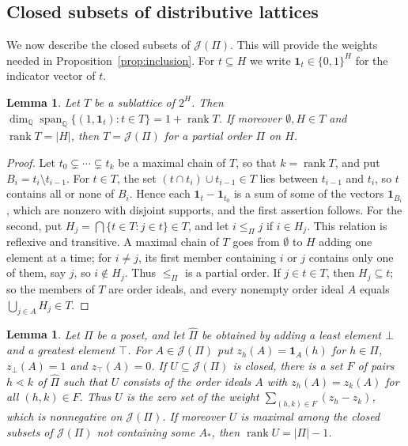 \documentclass{amsart}
\newtheorem{lemma}[theorem]{Lemma}
\theoremstyle{definition}
\DeclareMathOperator{\rk}{rank}
\newcommand{\Q}{\mathbb Q}
\newcommand{\one}{\mathbf 1}
\begin{document}
\subsection{Closed subsets of distributive lattices}
We now describe the closed subsets of $\mathcal J(\Pi)$. This will provide the weights needed in Proposition~\ref{prop:inclusion}. For $t\subseteq H$ we write $\one_t\in\{0,1\}^H$ for the indicator vector of $t$.

\begin{lemma}\label{lem:boolean}
Let $T$ be a sublattice of $2^H$. Then $\dim_\Q\operatorname{span}_\Q\{(1,\one_t):t\in T\}=1+\rk T$. If moreover $\emptyset,H\in T$ and $\rk T=|H|$, then $T=\mathcal J(\Pi)$ for a partial order $\Pi$ on $H$.
\end{lemma}

\begin{proof}
Let $t_0\subsetneq\cdots\subsetneq t_k$ be a maximal chain of $T$, so that $k=\rk T$, and put $B_i=t_i\setminus t_{i-1}$. For $t\in T$, the set $(t\cap t_i)\cup t_{i-1}\in T$ lies between $t_{i-1}$ and $t_i$, so $t$ contains all or none of $B_i$. Hence each $\one_t-\one_{t_0}$ is a sum of some of the vectors $\one_{B_i}$, which are nonzero with disjoint supports, and the first assertion follows. For the second, put $H_j=\bigcap\{t\in T:j\in t\}\in T$, and let $i\le_\Pi j$ if $i\in H_j$. This relation is reflexive and transitive. A maximal chain of $T$ goes from $\emptyset$ to $H$ adding one element at a time; for $i\ne j$, its first member containing $i$ or $j$ contains only one of them, say $j$, so $i\notin H_j$. Thus $\le_\Pi$ is a partial order. If $j\in t\in T$, then $H_j\subseteq t$; so the members of $T$ are order ideals, and every nonempty order ideal $A$ equals $\bigcup_{j\in A}H_j\in T$.
\end{proof}

\begin{lemma}\label{lem:closed-distributive}
Let $\Pi$ be a poset, and let $\widehat\Pi$ be obtained by adding a least element $\bot$ and a greatest element $\top$. For $A\in\mathcal J(\Pi)$ put $z_h(A)=\one_A(h)$ for $h\in\Pi$, $z_\bot(A)=1$ and $z_\top(A)=0$. If $U\subseteq\mathcal J(\Pi)$ is closed, there is a set $F$ of pairs $h\lessdot k$ of $\widehat\Pi$ such that $U$ consists of the order ideals $A$ with $z_h(A)=z_k(A)$ for all $(h,k)\in F$. Thus $U$ is the zero set of the weight $\sum_{(h,k)\in F}(z_h-z_k)$, which is nonnegative on $\mathcal J(\Pi)$. If moreover $U$ is maximal among the closed subsets of $\mathcal J(\Pi)$ not containing some $A_*$, then $\rk U=|\Pi|-1$.
\end{lemma}
\end{document}
